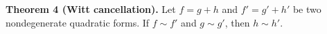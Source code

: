 \textbf{Theorem 4 (Witt cancellation).} Let $f = g + h$ and $f' = g' + h'$ be two nondegenerate quadratic forms. If $f \sim f'$ and $g \sim g'$, then $h \sim h'$.

